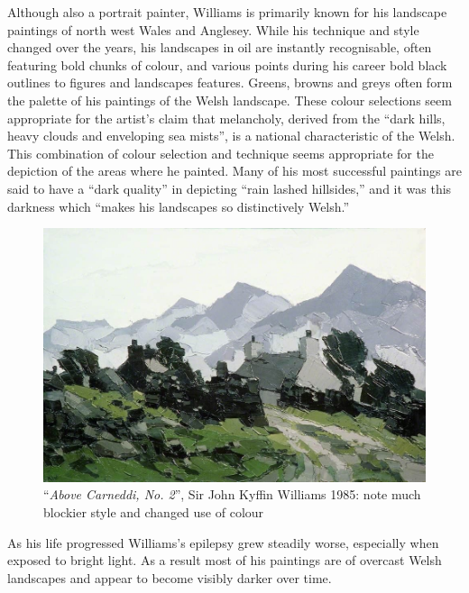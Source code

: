 
Although also a portrait painter, Williams is primarily known for his landscape
paintings of north west Wales and Anglesey. While his technique and style
changed over the years, his landscapes in oil are instantly recognisable, often
featuring bold chunks of colour, and various points during his career bold
black outlines to figures and landscapes features. Greens, browns and greys
often form the palette of his paintings of the Welsh landscape. These colour
selections seem appropriate for the artist’s claim that melancholy, derived
from the ``dark hills, heavy clouds and enveloping sea mists'', is a national
characteristic of the Welsh.\cite{Williams1993Across} This combination of
colour selection and technique seems appropriate for the depiction of the areas
where he painted. Many of his most successful paintings are said to have a
``dark quality'' in depicting ``rain lashed hillsides,'' and it was this
darkness which ``makes his landscapes so distinctively
Welsh.''\cite{Davies2004100} 

\begin{figure}[h]
\includegraphics[width=\linewidth]{img/above_carneddi_no_2.jpeg}
\caption[``\emph{Above Carneddi, No. 2}'']{``\emph{Above Carneddi, No. 2}'', Sir John Kyffin Williams 1985: note much
blockier style and changed use of colour}\label{late_example}
\end{figure}

As his life progressed Williams's epilepsy grew steadily worse, especially when exposed to 
bright light. As a result most of his paintings are of overcast Welsh landscapes and appear to 
become visibly darker over time\cite{Harris2011How}.

